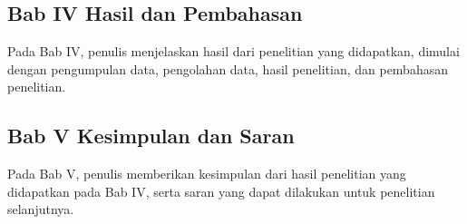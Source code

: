 \subsection{Bab IV Hasil dan Pembahasan}
Pada Bab IV, penulis menjelaskan hasil dari penelitian yang didapatkan, dimulai dengan pengumpulan data, pengolahan data, hasil penelitian, dan pembahasan penelitian. \par

\subsection{Bab V Kesimpulan dan Saran}
Pada Bab V, penulis memberikan kesimpulan dari hasil penelitian yang didapatkan pada Bab IV, serta saran yang dapat dilakukan untuk penelitian selanjutnya.
